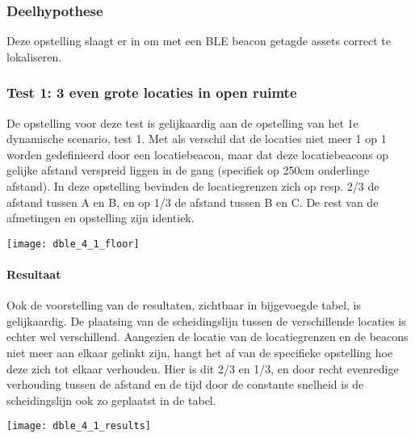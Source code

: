\subsubsection{Deelhypothese}
Deze opstelling slaagt er in om met een BLE beacon getagde assets correct te lokaliseren.

\subsubsection{Test 1: 3 even grote locaties in open ruimte}
\begin{minipage}{0.55\textwidth}
De opstelling voor deze test is gelijkaardig aan de opstelling van het 1e dynamische scenario, test 1. Met als verschil dat de locaties niet meer 1 op 1 worden gedefinieerd door een locatiebeacon, maar dat deze locatiebeacons op gelijke afstand verspreid liggen in de gang (specifiek op 250cm onderlinge afstand). In deze opstelling bevinden de locatiegrenzen zich op resp. 2/3 de afstand tussen A en B, en op 1/3 de afstand tussen B en C. De rest van de afmetingen en opstelling zijn identiek.
\end{minipage}
\hfill
\begin{minipage}{0.42\textwidth}
	\texttt{[image: dble\_4\_1\_floor]}
	\label{fig:ond-ble-dynamic-4-1-ops}
\end{minipage}

\paragraph{Resultaat}
\begin{minipage}{0.42\textwidth}
Ook de voorstelling van de resultaten, zichtbaar in bijgevoegde tabel, is gelijkaardig. De plaatsing van de scheidingslijn tussen de verschillende locaties is echter wel verschillend. Aangezien de locatie van de locatiegrenzen en de beacons niet meer aan elkaar gelinkt zijn, hangt het af van de specifieke opstelling hoe deze zich tot elkaar verhouden. Hier is dit 2/3 en 1/3, en door recht evenredige verhouding tussen de afstand en de tijd door de constante snelheid is de scheidingslijn ook zo geplaatst in de tabel.
\end{minipage}
\hfill
\begin{minipage}{0.55\textwidth}
	\texttt{[image: dble\_4\_1\_results]}
	\label{fig:ond-ble-dynamic-4-1-res}
\end{minipage}

